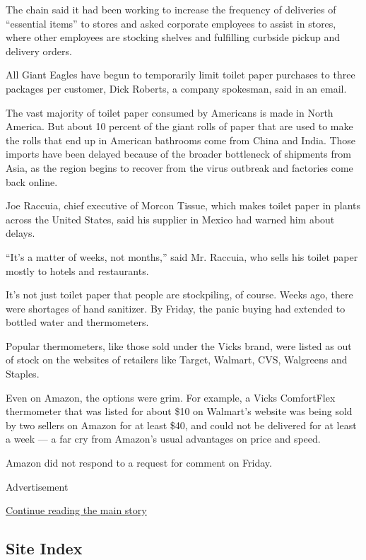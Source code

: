 The chain said it had been working to increase the frequency of
deliveries of ``essential items'' to stores and asked corporate
employees to assist in stores, where other employees are stocking
shelves and fulfilling curbside pickup and delivery orders.

All Giant Eagles have begun to temporarily limit toilet paper purchases
to three packages per customer, Dick Roberts, a company spokesman, said
in an email.

The vast majority of toilet paper consumed by Americans is made in North
America. But about 10 percent of the giant rolls of paper that are used
to make the rolls that end up in American bathrooms come from China and
India. Those imports have been delayed because of the broader bottleneck
of shipments from Asia, as the region begins to recover from the virus
outbreak and factories come back online.

Joe Raccuia, chief executive of Morcon Tissue, which makes toilet paper
in plants across the United States, said his supplier in Mexico had
warned him about delays.

``It's a matter of weeks, not months,'' said Mr. Raccuia, who sells his
toilet paper mostly to hotels and restaurants.

It's not just toilet paper that people are stockpiling, of course. Weeks
ago, there were shortages of hand sanitizer. By Friday, the panic buying
had extended to bottled water and thermometers.

Popular thermometers, like those sold under the Vicks brand, were listed
as out of stock on the websites of retailers like Target, Walmart, CVS,
Walgreens and Staples.

Even on Amazon, the options were grim. For example, a Vicks ComfortFlex
thermometer that was listed for about \$10 on Walmart's website was
being sold by two sellers on Amazon for at least \$40, and could not be
delivered for at least a week --- a far cry from Amazon's usual
advantages on price and speed.

Amazon did not respond to a request for comment on Friday.

Advertisement

\protect\hyperlink{after-bottom}{Continue reading the main story}

\hypertarget{site-index}{%
\subsection{Site Index}\label{site-index}}

